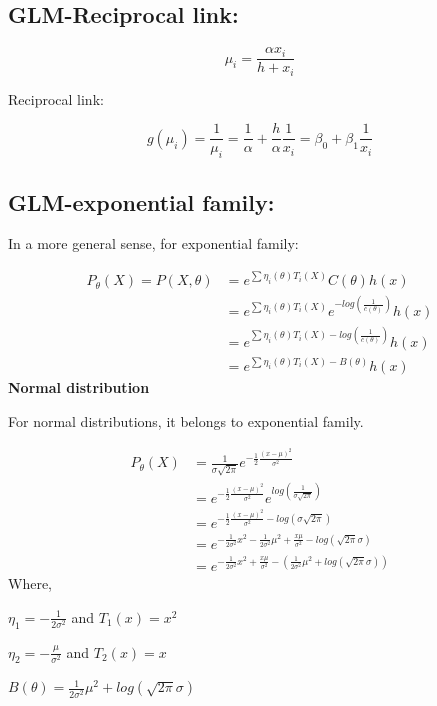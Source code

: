 \documentclass[]{book}
\begin{document}
\subsection{GLM-Reciprocal link:}\label{glm-reciprocal-link}

\[\mu_i=\frac{\alpha x_i}{h+x_i}\]

Reciprocal link:

\[g(\mu_i)=\frac{1}{\mu_i}=\frac{1}{\alpha}+\frac{h}{\alpha}\frac{1}{x_i}=\beta_0+\beta_1 \frac{1}{x_i}\]

\subsection{GLM-exponential family:}\label{glm-exponential-family}

In a more general sense, for exponential family:

\[\begin{aligned} P_{\theta}(X)=P(X, \theta)&= e^{\sum \eta_i(\theta)T_i(X)} C(\theta)h(x)\\ &=e^{\sum \eta_i(\theta)T_i(X)} e^{-log(\frac{1}{c(\theta)})}h(x) \\ &= e^{\sum \eta_i(\theta)T_i(X)-log(\frac{1}{c(\theta)})} h(x)  \\&= e^{\sum \eta_i(\theta)T_i(X)-B(\theta)} h(x) \end{aligned}\]
\textbf{Normal distribution}

For normal distributions, it belongs to exponential family.

\[\begin{aligned} P_{\theta}(X) &= \frac{1}{\sigma\sqrt{2\pi}} e^{-\frac{1}{2}\frac{(x-\mu)^2}{\sigma^2}}\\ &=e^{-\frac{1}{2}\frac{(x-\mu)^2}{\sigma^2}} e^{log(\frac{1}{\sigma\sqrt{2\pi}})} \\ &= e^{-\frac{1}{2}\frac{(x-\mu)^2}{\sigma^2}-log (\sigma\sqrt{2\pi})} \\ &= e^{-\frac{1}{2\sigma^2}x^2-\frac{1}{2\sigma^2} \mu^2+\frac{x\mu}{\sigma^2}-log(\sqrt{2\pi}\sigma)}\\ &=e^{-\frac{1}{2\sigma^2}x^2+\frac{x\mu}{\sigma^2}-(\frac{1}{2\sigma^2} \mu^2+log(\sqrt{2\pi}\sigma))} \end{aligned}\]
Where,

\(\eta_1 =-\frac{1}{2\sigma^2}\) and \(T_1(x)=x^2\)

\(\eta_2 =-\frac{\mu}{\sigma^2}\) and \(T_2(x)=x\)

\(B(\theta)=\frac{1}{2\sigma^2} \mu^2+log(\sqrt{2\pi}\sigma)\)
\end{document}
